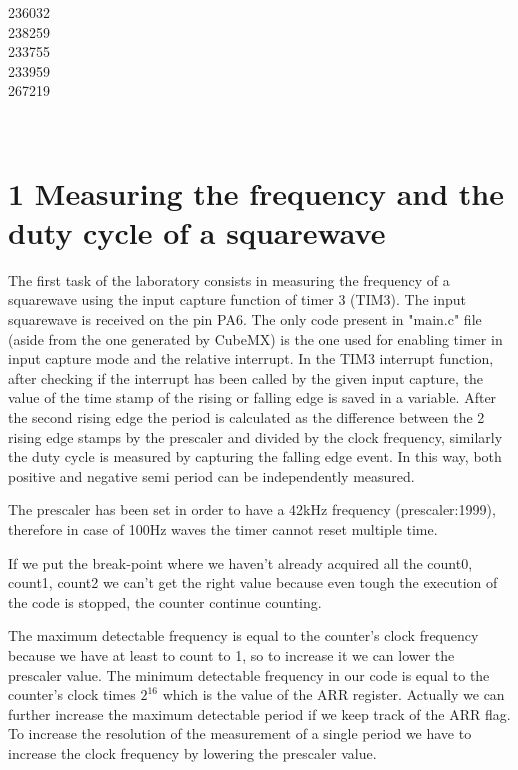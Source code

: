 \documentclass[12pt]{article}
\begin{document}
\begin{titlepage}
\begin{minipage}{0.4\textwidth}
			\begin{flushright} \large
			236032\\													%
			238259\\
            233755\\
            233959\\
            267219\\
            
		\end{flushright}
        
	\end{minipage}\\[2 cm]
	
\end{titlepage}

\newpage

\section*{1 Measuring the frequency and the duty cycle of a squarewave }

The first task of the laboratory consists in measuring the frequency of a squarewave using the input capture function of timer 3 (TIM3). The input squarewave is received on the pin PA6.
The only code present in "main.c" file (aside from the one generated by CubeMX) is the one used for enabling timer in input capture mode and the relative interrupt.
In the TIM3 interrupt function, after checking if the interrupt has been called by the given input capture, the value of the time stamp of the rising or falling edge is saved in a variable. After the second rising edge the period is calculated as the difference between the 2 rising edge stamps by the prescaler and divided by the clock frequency, similarly the duty cycle is measured by capturing the falling edge event. In this way, both positive and negative semi period can be independently measured.

The prescaler has been set in order to have a 42kHz frequency (prescaler:1999), therefore in case of 100Hz waves the timer cannot reset multiple time.

If we put the break-point where we haven't already acquired all the count0, count1, count2 we can't get the right value because even tough the execution of the code is stopped, the counter continue counting.

The maximum detectable frequency is equal to the counter's clock frequency because we have at least to count to 1, so to increase it we can lower the prescaler value. The minimum detectable frequency in our code is equal to the counter's clock times $2^{16}$ which is the value of the ARR register. Actually we can further increase the maximum detectable period if we keep track of the ARR flag. \\
To increase the resolution of the measurement of a single period we have to increase the clock frequency by lowering the prescaler value.
\end{document}
